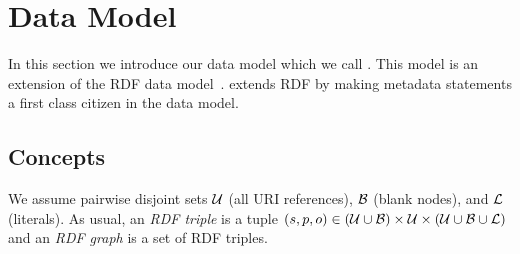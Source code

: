 \section{Data Model} \label{Section:DataModel}

In this section we introduce
	our data model which we call {\RDFplus}. This model is an extension of the RDF data model~\cite{Klyne04:RDFconcepts}. {\RDFplus} extends RDF by making metadata statements a first class citizen in the data model.



\subsection{Concepts}

We assume
pairwise disjoint sets $\mathcal{U}$ (all URI references), $\mathcal{B}$ (blank nodes), and $\mathcal{L}$ (literals).
	As usual, an \emph{RDF triple} is a tuple $(s,p,o) \in (\mathcal{U} \cup \mathcal{B}) \times \mathcal{U} \times (\mathcal{U} \cup \mathcal{B} \cup \mathcal{L})$ and an \emph{RDF graph} is a set of RDF triples.

